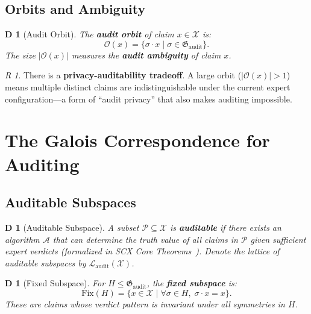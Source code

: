 \documentclass[12pt,a4paper]{article}
\newtheorem{definition}[theorem]Definition
\theoremstyle{remark}
\newtheorem{remark}[theorem]Remark
\newcommand{\Fix}{\mathrm{Fix}}
\newcommand{\AuditGrp}{\mathfrak{G}_{\mathrm{audit}}}
\newcommand{\ClaimSpace}{\mathcal{X}}
\begin{document}
\subsection{Orbits and Ambiguity}
\begin{definition}[Audit Orbit]
The \textbf{audit orbit} of claim \(x \in \ClaimSpace\) is:
\begin{equation}
    \mathcal{O}(x) = \{\sigma \cdot x \mid \sigma \in \AuditGrp\}.
\end{equation}
The size \(|\mathcal{O}(x)|\) measures the \textbf{audit ambiguity} of claim \(x\).
\end{definition}
\begin{remark}
There is a \textbf{privacy-auditability tradeoff}. A large orbit (\(|\mathcal{O}(x)| > 1\)) means multiple distinct claims are indistinguishable under the current expert configuration---a form of ``audit privacy'' that also makes auditing impossible.
\end{remark}
\section{The Galois Correspondence for Auditing}
\subsection{Auditable Subspaces}
\begin{definition}[Auditable Subspace]
A subset \(\mathcal{P} \subseteq \ClaimSpace\) is \textbf{auditable} if there exists an algorithm \(\mathcal{A}\) that can determine the truth value of all claims in \(\mathcal{P}\) given sufficient expert verdicts (formalized in SCX Core Theorems~\cite{scx2026theorems}). Denote the lattice of auditable subspaces by \(\mathcal{L}_{\mathrm{audit}}(\ClaimSpace)\).
\end{definition}

\begin{definition}[Fixed Subspace]
For \(H \leq \AuditGrp\), the \textbf{fixed subspace} is:
\begin{equation}
    \Fix(H) = \{x \in \ClaimSpace \mid \forall \sigma \in H,\; \sigma \cdot x = x\}.
\end{equation}
These are claims whose verdict pattern is invariant under all symmetries in \(H\).
\end{definition}
\end{document}
